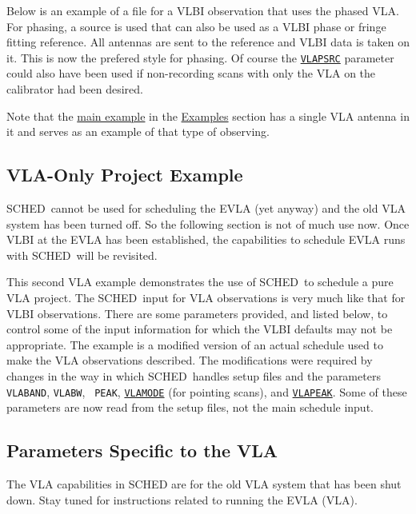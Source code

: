 \documentclass{report}
\newcommand{\schedb}{{\sc SCHED~}}
\begin{document}
Below is an example of a file for a VLBI observation that uses the
phased VLA.  For phasing, a source is used that can also be used as a
VLBI phase or fringe fitting reference.  All antennas are sent to the
reference and VLBI data is taken on it.  This is now the prefered
style for phasing.  Of course the 
{\hyperref[MP:VLAPSRC]{{\tt VLAPSRC}}}
parameter could also have been used if non-recording scans with only
the VLA on the calibrator had been desired.

Note that the 
{\hyperref[SSEC:EXAMPLE1]{main example}} in the
{\hyperref[SEC:EXAMPLES]{Examples}} section has a single VLA antenna
in it and serves as an example of that type of observing.


\subsection{\label{SSEC:VLAONLY}VLA-Only Project Example}

\schedb cannot be used for scheduling the EVLA (yet anyway) and the
old VLA system has been turned off.  So the following section is not
of much use now.  Once VLBI at the EVLA has been established, the
capabilities to schedule EVLA runs with \schedb will be revisited.

This second VLA example demonstrates the use of \schedb to schedule a
pure VLA project.  The \schedb input for VLA observations is very much
like that for VLBI observations.  There are some parameters provided,
and listed below, to control some of the input information for which
the VLBI defaults may not be appropriate.  The example is a modified
version of an actual schedule used to make the VLA observations
described.  The modifications were required by changes in the way in
which \schedb handles setup files and the parameters {\tt
VLABAND}, {\tt VLABW}, {\tt
PEAK}, 
{\hyperref[MP:VLAMODE]{{\tt VLAMODE}}} (for pointing
scans), and 
{\hyperref[MP:VLAPEAK]{{\tt VLAPEAK}}}.  Some of these
parameters are now read from the setup files, not the main schedule
input.



\subsection{\label{SSEC:VLAPAR}Parameters Specific to the VLA}

The VLA capabilities in SCHED are for the old VLA system that has
been shut down.  Stay tuned for instructions related to running
the EVLA (VLA).
\end{document}
